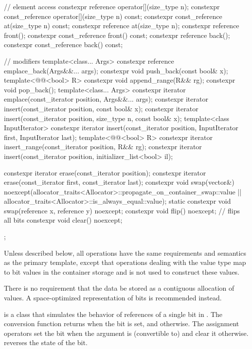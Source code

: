 \begin{codeblock}
{{    // element access
    constexpr reference       operator[](size_type n);
    constexpr const_reference operator[](size_type n) const;
    constexpr const_reference at(size_type n) const;
    constexpr reference       at(size_type n);
    constexpr reference       front();
    constexpr const_reference front() const;
    constexpr reference       back();
    constexpr const_reference back() const;

    // modifiers
    template<class... Args> constexpr reference emplace_back(Args&&... args);
    constexpr void push_back(const bool& x);
    template<@@<bool> R>
      constexpr void append_range(R&& rg);
    constexpr void pop_back();
    template<class... Args> constexpr iterator emplace(const_iterator position, Args&&... args);
    constexpr iterator insert(const_iterator position, const bool& x);
    constexpr iterator insert(const_iterator position, size_type n, const bool& x);
    template<class InputIterator>
      constexpr iterator insert(const_iterator position,
                                InputIterator first, InputIterator last);
    template<@@<bool> R>
      constexpr iterator insert_range(const_iterator position, R&& rg);
    constexpr iterator insert(const_iterator position, initializer_list<bool> il);

    constexpr iterator erase(const_iterator position);
    constexpr iterator erase(const_iterator first, const_iterator last);
    constexpr void swap(vector&)
      noexcept(allocator_traits<Allocator>::propagate_on_container_swap::value ||
               allocator_traits<Allocator>::is_always_equal::value);
    static constexpr void swap(reference x, reference y) noexcept;
    constexpr void flip() noexcept;     // flips all bits
    constexpr void clear() noexcept;
  };
}
\end{codeblock}%

\pnum
Unless described below, all operations have the same requirements and
semantics as the primary  template, except that operations
dealing with the  value type map to bit values in the
container storage and
is not used to construct these values.

\pnum
There is no requirement that the data be stored as a contiguous allocation
of  values. A space-optimized representation of bits is
recommended instead.

\pnum
{}
is a class that simulates the behavior of references of a single bit in
. The conversion function returns 
when the bit is set, and  otherwise. The assignment operators
set the bit when the argument is (convertible to)  and
clear it otherwise.  reverses the state of the bit.

